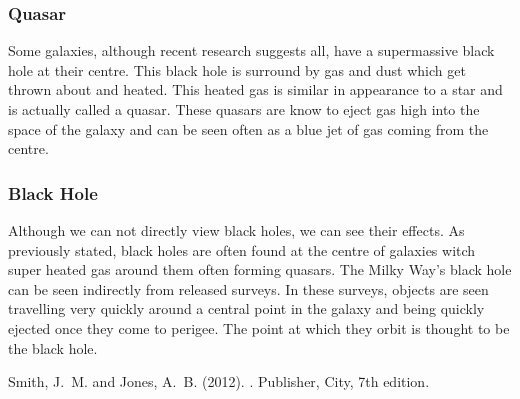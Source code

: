 \documentclass{article}
\begin{document}
\subsubsection{Quasar}
Some galaxies, although recent research suggests all, have a supermassive black hole at their 
centre. This black hole is surround by gas and dust which get thrown about and heated. This
heated gas is similar in appearance to a star and is actually called a quasar. These quasars
are know to eject gas high into the space of the galaxy and can be seen often as a blue jet
of gas coming from the centre.

\subsubsection{Black Hole}
Although we can not directly view black holes, we can see their effects. As previously stated,
black holes are often found at the centre of galaxies witch super heated gas around them often
forming quasars. The Milky Way's black hole can be seen indirectly from released surveys. In
these surveys, objects are seen travelling very quickly around a central point in the galaxy and
being quickly ejected once they come to perigee. The point at which they orbit is thought
to be the black hole.


\begin{thebibliography}{9}

Smith, J.~M. and Jones, A.~B. (2012).
.
\newblock Publisher, City, 7th edition.

\end{thebibliography}
\end{document}

